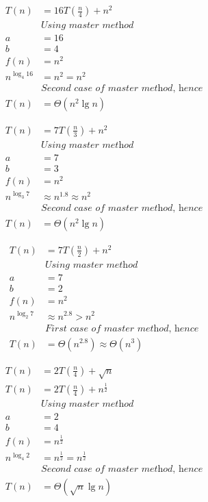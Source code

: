\documentclass[11pt]{article}
\begin{document}
\begin{align*}
  T(n) &= 16T(\frac{n}{4}) + n^2 \\
  &\textit{Using master method} \\
  a &= 16 \\
  b &= 4 \\
  f(n) &= n^2 \\
  n^{\log_4 16} &= n^2 = n^2 \\
  &\textit{Second case of master method, hence} \\
  T(n) &= \Theta(n^2\lg n)
\end{align*}

\begin{align*}
  T(n) &= 7T(\frac{n}{3}) + n^2 \\
  &\textit{Using master method} \\
  a &= 7 \\
  b &= 3 \\
  f(n) &= n^2 \\
  n^{\log_3 7} &\approx n^{1.8} \approx n^2 \\
  &\textit{Second case of master method, hence} \\
  T(n) &= \Theta(n^2\lg n)
\end{align*}

\begin{align*}
  T(n) &= 7T(\frac{n}{2}) + n^2 \\
  &\textit{Using master method} \\
  a &= 7 \\
  b &= 2 \\
  f(n) &= n^2 \\
  n^{\log_2 7} &\approx n^{2.8} > n^2 \\
  &\textit{First case of master method, hence} \\
  T(n) &= \Theta(n^{2.8}) \approx \Theta(n^3)
\end{align*}

\begin{align*}
  T(n) &= 2T(\frac{n}{4}) + \sqrt{n} \\
  T(n) &= 2T(\frac{n}{4}) + n^{\frac{1}{2}} \\
  &\textit{Using master method} \\
  a &= 2 \\
  b &= 4 \\
  f(n) &= n^{\frac{1}{2}} \\
  n^{\log_4 2} &= n^{\frac{1}{2}} = n^{\frac{1}{2}} \\
  &\textit{Second case of master method, hence} \\
  T(n) &= \Theta(\sqrt{n} \lg n)
\end{align*}
\end{document}
